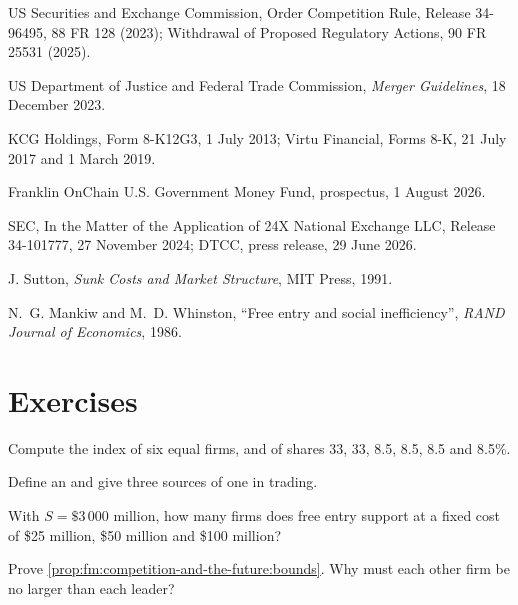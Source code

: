 \begin{omsources}
\item US Securities and Exchange Commission, Order Competition Rule, Release 34-96495, 88 FR 128 (2023); Withdrawal of Proposed Regulatory Actions,
90 FR 25531 (2025).
\item US Department of Justice and Federal Trade Commission, \emph{Merger Guidelines}, 18 December 2023.
\item KCG Holdings, Form 8-K12G3, 1 July 2013; Virtu Financial, Forms 8-K, 21 July 2017 and 1 March 2019.
\item Franklin OnChain U.S. Government Money Fund, prospectus, 1 August 2026.
\item SEC, In the Matter of the Application of 24X National Exchange LLC, Release 34-101777, 27 November 2024; DTCC, press release, 29 June 2026.
\item J. Sutton, \emph{Sunk Costs and Market Structure}, MIT Press, 1991.
\item N.~G. Mankiw and M.~D. Whinston, ``Free entry and social inefficiency'', \emph{RAND Journal of Economics}, 1986.
\end{omsources}

\section{Exercises}

\begin{exercise}[$\star$]\label{exo:fm:competition-and-the-future:1}
Compute the index of six equal firms, and of shares 33, 33, 8.5, 8.5, 8.5 and 8.5\%.
\end{exercise}

\begin{exercise}[$\star$]\label{exo:fm:competition-and-the-future:2}
Define an  and give three sources of one in trading.
\end{exercise}

\begin{exercise}[$\star$]\label{exo:fm:competition-and-the-future:3}
With $S=\$3\,000$ million, how many firms does free entry support at a fixed cost of \$25 million, \$50 million and \$100 million?
\end{exercise}

\begin{exercise}[$\star\star$]\label{exo:fm:competition-and-the-future:4}
Prove \cref{prop:fm:competition-and-the-future:bounds}. Why must each other firm be no larger than each leader?
\end{exercise}

